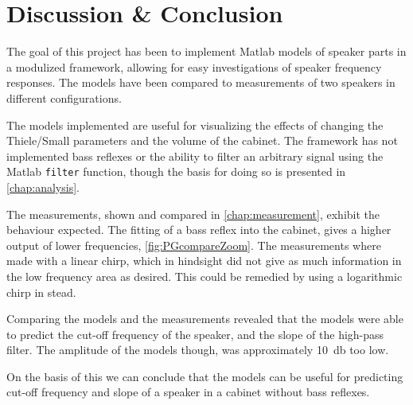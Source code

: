 
\chapter{Discussion \& Conclusion}
\label{sec:discussion}

The goal of this project has been to implement Matlab models of speaker parts in a modulized framework, allowing for easy investigations of speaker frequency responses.
The models have been compared to measurements of two speakers in different configurations.

The models implemented are useful for visualizing the effects of changing the Thiele/Small parameters and the volume of the cabinet.
The framework has not implemented bass reflexes or the ability to filter an arbitrary signal using the Matlab \texttt{filter} function, though the basis for doing so is presented in \cref{chap:analysis}.

The measurements, shown and compared in \cref{chap:measurement}, exhibit the behaviour expected.
The fitting of a bass reflex into the cabinet, gives a higher output of lower frequencies, \cref{fig:PGcompareZoom}.
The measurements where made with a linear chirp, which in hindsight did not give as much information in the low frequency area as desired.
This could be remedied by using a logarithmic chirp in stead.

Comparing the models and the measurements revealed that the models were able to predict the cut-off frequency of the speaker, and the slope of the high-pass filter.
The amplitude of the models though, was approximately \SI{10}{\decibel} too low.

On the basis of this we can conclude that the models can be useful for predicting cut-off frequency and slope of a speaker in a cabinet without bass reflexes.